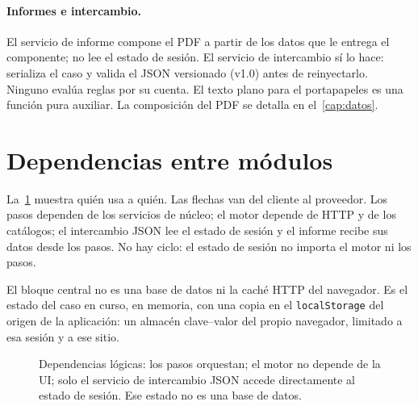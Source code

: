 \paragraph{Informes e intercambio.}
El servicio de informe compone el PDF a partir de los datos que le
entrega el componente; no lee el estado de sesión. El servicio de
intercambio sí lo hace: serializa el caso y valida el JSON versionado
(v1.0) antes de reinyectarlo. Ninguno evalúa reglas por su cuenta. El
texto plano para el portapapeles es una función pura auxiliar. La
composición del PDF se detalla en el~\cref{cap:datos}.

\section{Dependencias entre módulos}

La~\cref{fig:arq-deps} muestra quién usa a quién. Las flechas van del
cliente al proveedor. Los pasos dependen de los servicios de núcleo; el
motor depende de HTTP y de los catálogos; el intercambio JSON lee el
estado de sesión y el informe recibe sus datos desde los pasos. No hay
ciclo: el estado de sesión no importa el motor ni los pasos.

El bloque central no es una base de datos ni la caché HTTP del
navegador. Es el estado del caso en curso, en memoria, con una copia en
el \texttt{localStorage} del origen de la aplicación: un almacén
clave--valor del propio navegador, limitado a esa sesión y a ese sitio.

\begin{figure}[H]
  \centering
  \caption{Dependencias lógicas: los pasos orquestan; el motor no
  depende de la UI; solo el servicio de intercambio JSON accede
  directamente al estado de sesión. Ese estado no es una base de datos.}
  \label{fig:arq-deps}
\end{figure}

